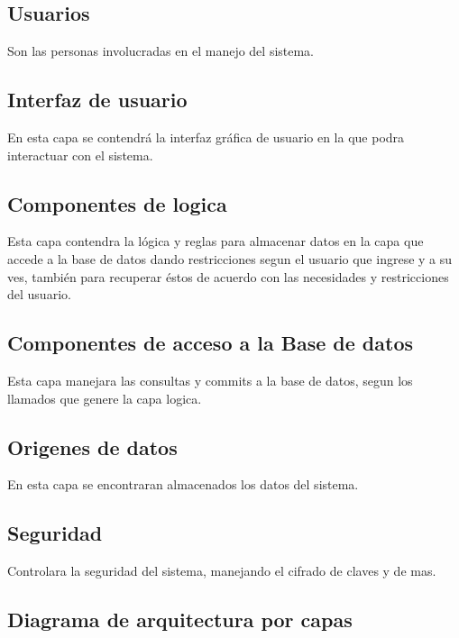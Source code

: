 \documentclass[12pt]{article}
\begin{document}
\subsection{Usuarios} 
Son las personas involucradas en el manejo del sistema.
\subsection{Interfaz de usuario}
En esta capa se contendr\'a la interfaz gráfica de usuario en la que podra interactuar con el sistema.
\subsection{Componentes de logica}
Esta capa contendra la lógica y reglas para almacenar datos en la capa que accede a la base de datos dando restricciones segun el usuario que ingrese y a su ves, tambi\'en para recuperar éstos de acuerdo con las necesidades y restricciones del usuario.
\subsection{Componentes de acceso a la Base de datos}
Esta capa manejara las consultas y commits a la base de datos, segun los llamados que genere la capa logica.
\subsection{Origenes de datos}
En esta capa se encontraran almacenados los datos del sistema.
\subsection{Seguridad}
Controlara la seguridad del sistema, manejando el cifrado de claves y de mas.
\subsection{Diagrama de arquitectura por capas}
\begin{center}
\end{center}
\end{document}
